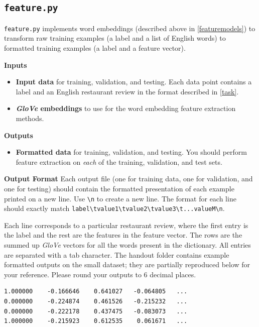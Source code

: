 \documentclass[11pt,addpoints,answers]{exam}
\begin{document}
\subsection{\texttt{feature.py}}\label{featurepy}

\lstinline{feature.py} implements word embeddings (described above in \ref{featuremodels}) to transform raw training examples (a label and a list of English words) to formatted training examples (a label and a feature vector).

{\bf Inputs }
\begin{itemize}
    \item \textbf{Input data} for training, validation, and testing. Each data point contains a label and an English restaurant review in the format described in \ref{task}.
    \item \textbf{\emph{GloVe} embeddings} to use for the word embedding feature extraction methods.
\end{itemize}

{\bf Outputs }
\begin{itemize}
    \item \textbf{Formatted data} for training, validation, and testing. You should perform feature extraction on \textit{each} of the training, validation, and test sets.
\end{itemize}

{\bf Output Format }
Each output file (one for training data, one for validation, and one for testing) should contain the formatted presentation of each example printed on a new line. Use \lstinline{\n} to create a new line. The format for each line should exactly match \lstinline{label\tvalue1\tvalue2\tvalue3\t...valueM\n}.

Each line corresponds to a particular restaurant review, where the first entry is the label and the rest are the features in the feature vector. The rows are the summed up \emph{GloVe} vectors for all the words present in the dictionary. All entries are separated with a tab character. The handout folder contains example formatted outputs on the small dataset; they are partially reproduced below for your reference. Please round your outputs to 6 decimal places.


\begin{lstlisting}
1.000000	-0.166646	 0.641027	-0.064805	...
0.000000	-0.224874	 0.461526	-0.215232	...
0.000000	-0.222178	 0.437475	-0.083073	...
1.000000	-0.215923	 0.612535	 0.061671	...
\end{lstlisting}
\end{document}
